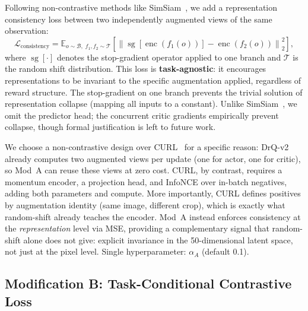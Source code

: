 \documentclass{article}
\begin{document}
Following non-contrastive methods like SimSiam~\citep{chen2021exploring}, we add a representation consistency loss between two independently augmented views of the same observation:
\begin{equation}
  \mathcal{L}_{\text{consistency}} = \mathbb{E}_{o \sim \mathcal{B},\; f_1, f_2 \sim \mathcal{T}} \left[\left\| \operatorname{sg}[\operatorname{enc}(f_1(o))] - \operatorname{enc}(f_2(o)) \right\|_2^2 \right],
  \label{eq:consistency}
\end{equation}
where $\operatorname{sg}[\cdot]$ denotes the stop-gradient operator applied to one branch and $\mathcal{T}$ is the random shift distribution.
This loss is \textbf{task-agnostic}: it encourages representations to be invariant to the specific augmentation applied, regardless of reward structure.
The stop-gradient on one branch prevents the trivial solution of representation collapse (mapping all inputs to a constant). Unlike SimSiam~\citep{chen2021exploring}, we omit the predictor head; the concurrent critic gradients empirically prevent collapse, though formal justification is left to future work.

We choose a non-contrastive design over CURL~\citep{srinivas2020curl} for a specific reason: DrQ-v2 already computes two augmented views per update (one for actor, one for critic), so Mod~A can reuse these views at zero cost.
CURL, by contrast, requires a momentum encoder, a projection head, and InfoNCE over in-batch negatives, adding both parameters and compute.
More importantly, CURL defines positives by augmentation identity (same image, different crop), which is exactly what random-shift already teaches the encoder.
Mod~A instead enforces consistency at the \emph{representation} level via MSE, providing a complementary signal that random-shift alone does not give: explicit invariance in the 50-dimensional latent space, not just at the pixel level.
Single hyperparameter: $\alpha_A$ (default 0.1).

\subsection{Modification B: Task-Conditional Contrastive Loss}
\end{document}
